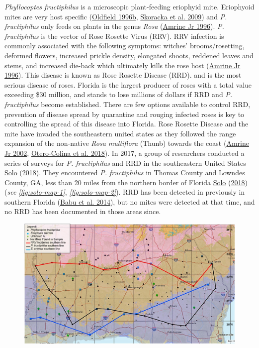 \documentclass[12pt,final,CPage]{ufthesis}
\begin{document}
{  \emph{Phyllocoptes fructiphilus} is a microscopic plant-feeding eriophyid mite. Eriophyoid mites are very host specific (\protect\hyperlink{ref-Oldfield1996c}{Oldfield 1996b}, \protect\hyperlink{ref-Skoracka2009}{Skoracka et al. 2009}) and \emph{P. fructiphilus} only feeds on plants in the genus \emph{Rosa} (\protect\hyperlink{ref-Amrine1996}{Amrine Jr 1996}). \emph{P. fructiphilus} is the vector of Rose Rosette Virus (RRV). RRV infection is commonly associated with the following symptoms: witches' brooms/rosetting, deformed flowers, increased prickle density, elongated shoots, reddened leaves and stems, and increased die-back which ultimately kills the rose host (\protect\hyperlink{ref-Amrine1996}{Amrine Jr 1996}). This disease is known as Rose Rosette Disease (RRD). and is the most serious disease of roses. Florida is the largest producer of roses with a total value exceeding \$30 million, and stands to lose millions of dollars if RRD and \emph{P. fructiphilus} become established. There are few options available to control RRD, prevention of disease spread by quarantine and rouging infected roses is key to controlling the spread of this disease into Florida. Rose Rosette Disease and the mite have invaded the southeastern united states as they followed the range expansion of the non-native \emph{Rosa multiflora} (Thunb) towards the coast (\protect\hyperlink{ref-Amrine2002}{Amrine Jr 2002}, \protect\hyperlink{ref-Otero-Colina2018}{Otero-Colina et al. 2018}). In 2017, a group of researchers conducted a series of surveys for \emph{P. fructiphilus} and RRD in the southeastern United States \protect\hyperlink{ref-Solo2018}{Solo} (\protect\hyperlink{ref-Solo2018}{2018}). They encountered \emph{P. fructiphilus} in Thomas County and Lowndes County, GA, less than 20 miles from the northern border of Florida \protect\hyperlink{ref-Solo2018}{Solo} (\protect\hyperlink{ref-Solo2018}{2018}) (\emph{see} \emph{\ref{fig:solo-map-1}}, \emph{\ref{fig:solo-map-2}}). RRD has been detected in previously in southern Florida (\protect\hyperlink{ref-Babu2014}{Babu et al. 2014}), but no mites were detected at that time, and no RRD has been documented in those areas since.
  \begin{figure}

  {\centering \includegraphics[width=1\linewidth]{figure/full-1288fig1} 

}
\end{figure}}
\end{document}
